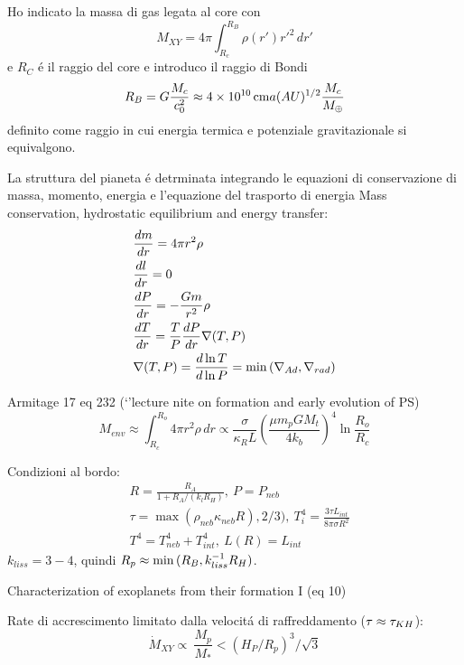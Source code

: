 Ho indicato la massa di gas legata al core con
\begin{equation}
M_{XY}=4\pi\int_{R_c}^{R_B}\rho(r')r'^2\,dr'
\end{equation}
e $R_C$ \'e il raggio del core e introduco il raggio di Bondi
\begin{equation}
R_B=G\frac{M_c}{c_0^2}\approx\SI{4e10}{\cm}a(AU)\expy{1/2}\frac{M_c}{\mearth{}}
\end{equation}
definito come raggio in cui energia termica e potenziale gravitazionale si equivalgono.%

La struttura del pianeta \'e detrminata integrando le equazioni di conservazione di massa, momento, energia e l'equazione del trasporto di energia
Mass conservation, hydrostatic equilibrium and energy transfer:
\begin{align}
&\TDy{r}{m}=4\pi r^2\rho\\
&\TDy{r}{l}=0\\
&\TDy{r}{P}=-\frac{Gm}{r^2}\rho\\
&\TDy{r}{T}=\frac{T}{P}\TDy{r}{P}\nabla(T,P)\\
&\nabla(T,P)=\TDly{P}{T}=\min{(\nad{},\nrad{})}
\end{align}


\begin{workout}
Armitage 17 eq 232 (`'lecture nite on formation and early evolution of PS)
\begin{equation}
M_{env}\approx\int_{R_c}^{R_o}4\pi r^2\rho\,dr\propto\frac{\sigma}{\kappa_RL}(\frac{\mu m_pGM_t}{4k_b})^4\ln{\frac{R_o}{R_c}}
\end{equation}
\end{workout}

Condizioni al bordo:
\begin{align}
&R=\frac{R_A}{1+R_A/(k_lR_H )},\ P=P_{neb}\\
&\tau=\max{(\rho_{neb}\kappa_{neb}R),2/3)},\ T_i^4=\frac{3\tau L_{int}}{8\pi\sigma R^2}\\
&T^4=T_{neb}^4+T_{int}^4,\ L(R)=L_{int}
\end{align}
$k_{liss}=3-4$, quindi $R_p\approx \min{(R_B,k_{liss}\expy{-1}R_H)}$.

\begin{workout}
Characterization of exoplanets from their formation I (eq 10)
\end{workout}

Rate di accrescimento limitato dalla velocit\'a di raffreddamento ($\tau\approx\tkh{}$):
\begin{equation}
\dot{M}_{XY}\propto\ \frac{M_p}{M_*}<(H_P/R_p)^3/\sqrt{3}
\end{equation}

